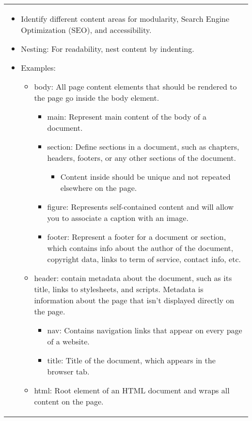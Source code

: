 \begin{summary}
\begin{center}
\begin{tabular}{ll}
            \multicolumn{2}{p{\linewidth}}{\begin{itemize}
                \item Identify different content areas for modularity, Search Engine Optimization (SEO), and accessibility. 
                \item Nesting: For readability, nest content by indenting.
                \item Examples:
                \begin{itemize}
                    \item body: All page content elements that should be rendered to the page go inside the body element.
                    \begin{itemize}
                        \item main: Represent main content of the body of a document. 
                        \item section: Define sections in a document, such as chapters, headers, footers, or any other sections of the document.
                        \begin{itemize}
                            \item Content inside should be unique and not repeated elsewhere on the page.
                        \end{itemize}
                        \item figure: Represents self-contained content and will allow you to associate a caption with an image.
                        \item footer: Represent a footer for a document or section, which contains info about the author of the document, copyright data, links to term of service, contact info, etc. 
                    \end{itemize}
                    \item header: contain metadata about the document, such as its title, links to stylesheets, and scripts. Metadata is information about the page that isn't displayed directly on the page.
                    \begin{itemize}
                        \item nav: Contains navigation links that appear on every page of a website.
                        \item title: Title of the document, which appears in the browser tab.
                    \end{itemize}
                    \item html: Root element of an HTML document and wraps all content on the page. 

\end{itemize}
\end{itemize}}
\end{tabular}
\end{center}
\end{summary}

